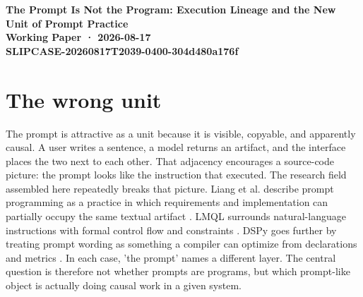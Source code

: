 \documentclass[11pt]{article}
\begin{document}
\begin{center}\Large\bfseries The Prompt Is Not the Program: Execution Lineage and the New Unit of Prompt Practice\\[0.6em]\normalsize Working Paper · 2026-08-17\\\small SLIPCASE-20260817T2039-0400-304d480a176f\end{center}\vspace{1em}
\begin{abstract}Prompt research often treats the visible prompt as the causal unit linking an author to a generated artifact. The field compiled here makes that unit unstable. Text-to-image systems can return polished outputs while failing to interpret parts of the input; deployed systems can rewrite a user's request before generation; prompt compilers can synthesize the executed wording from declarations and metrics; soft prompts can control models without readable words; and optimization systems can revise or evolve prompts without preserving any privileged original sentence. I argue that the durable unit of prompt practice is therefore not the prompt but the execution lineage: the traceable sequence from user formulation through transformations, conditioning, sampling, output, evaluation, and revision. This shift changes what must be preserved for reproducibility, authorship, debugging, and criticism. A prompt receipt that stores only visible text is insufficient whenever the executed instruction, model state, or selection machinery differs from what the user wrote. The paper proposes a minimal execution-lineage schema and shows how default-image failures make the stakes visible: successful generation and successful interpretation are separable events.\end{abstract}
\section{The wrong unit}
The prompt is attractive as a unit because it is visible, copyable, and apparently causal. A user writes a sentence, a model returns an artifact, and the interface places the two next to each other. That adjacency encourages a source-code picture: the prompt looks like the instruction that executed. The research field assembled here repeatedly breaks that picture. Liang et al. describe prompt programming as a practice in which requirements and implementation can partially occupy the same textual artifact \citep{Liang2025PromptsPrograms}. LMQL surrounds natural-language instructions with formal control flow and constraints \citep{BeurerKellner2023LMQL}. DSPy goes further by treating prompt wording as something a compiler can optimize from declarations and metrics \citep{Khattab2023DSPy}. In each case, 'the prompt' names a different layer. The central question is therefore not whether prompts are programs, but which prompt-like object is actually doing causal work in a given system.
\end{document}
